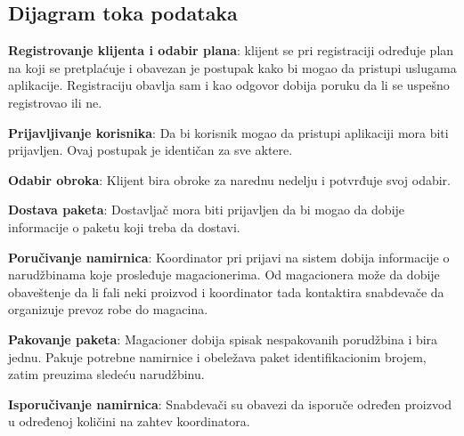 \subsection{Dijagram toka podataka}

	\textbf{Registrovanje klijenta i odabir plana}: klijent se pri registraciji određuje plan na koji se pretplaćuje i obavezan je postupak kako bi mogao da pristupi uslugama aplikacije. Registraciju obavlja sam i kao odgovor dobija poruku da li se uspešno registrovao ili ne.
	
	\textbf{Prijavljivanje korisnika}: Da bi korisnik mogao da pristupi aplikaciji mora biti prijavljen. Ovaj postupak je identičan za sve aktere.
		
	\textbf{Odabir obroka}: Klijent bira obroke za narednu nedelju i potvrđuje svoj odabir.
	
	
	\textbf{Dostava paketa}: Dostavljač mora biti prijavljen da bi mogao da dobije informacije o paketu koji treba da dostavi. 
	
	
	\textbf{Poručivanje namirnica}: Koordinator pri prijavi na sistem dobija informacije o narudžbinama koje prosleđuje magacionerima. Od magacionera može da dobije obaveštenje da li fali neki proizvod i koordinator tada kontaktira snabdevače da organizuje prevoz robe do magacina. 
	
	\textbf{Pakovanje paketa}: Magacioner dobija spisak nespakovanih porudžbina i bira jednu. Pakuje potrebne namirnice i obeležava paket identifikacionim brojem, zatim preuzima sledeću narudžbinu.
	
	\textbf{Isporučivanje namirnica}: Snabdevači su obavezi da isporuče određen proizvod u određenoj količini na zahtev koordinatora. 
	